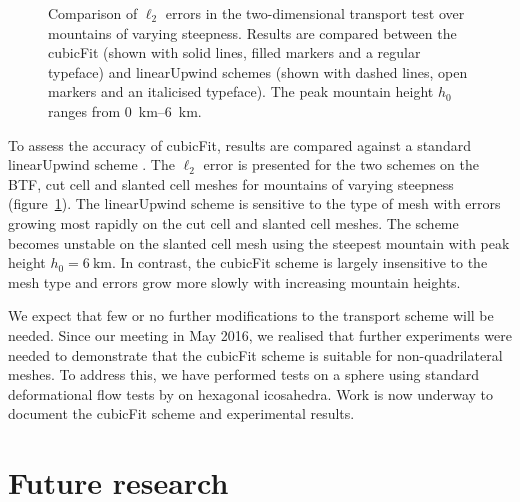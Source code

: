 \documentclass[a4paper,11pt]{article}
\begin{document}
\begin{figure}
	\centering
	
	\caption{Comparison of $\ell_2$ errors in the two-dimensional transport test over mountains of varying steepness.  Results are compared between the cubicFit (shown with solid lines, filled markers and a regular typeface) and linearUpwind schemes (shown with dashed lines, open markers and an italicised typeface).  The peak mountain height $h_0$ ranges from \SIrange{0}{6}{\kilo\meter}.}
	\label{fig:mountainAdvection-errors}
\end{figure}

To assess the accuracy of cubicFit, results are compared against a standard linearUpwind scheme .
The $\ell_2$ error is presented for the two schemes on the BTF, cut cell and slanted cell meshes for mountains of varying steepness (figure~\ref{fig:mountainAdvection-errors}).
The linearUpwind scheme is sensitive to the type of mesh with errors growing most rapidly on the cut cell and slanted cell meshes.  The scheme becomes unstable on the slanted cell mesh using the steepest mountain with peak height $h_0 = \SI{6}{\kilo\meter}$.
In contrast, the cubicFit scheme is largely insensitive to the mesh type and errors grow more slowly with increasing mountain heights.

We expect that few or no further modifications to the transport scheme will be needed.   Since our meeting in May 2016, we realised that further experiments were needed to demonstrate that the cubicFit scheme is suitable for non-quadrilateral meshes.  To address this, we have performed tests on a sphere using standard deformational flow tests by \citet{lauritzen2012} on hexagonal icosahedra.
Work is now underway to document the cubicFit scheme and experimental results.

\section{Future research}
\label{sec:future}
\end{document}
